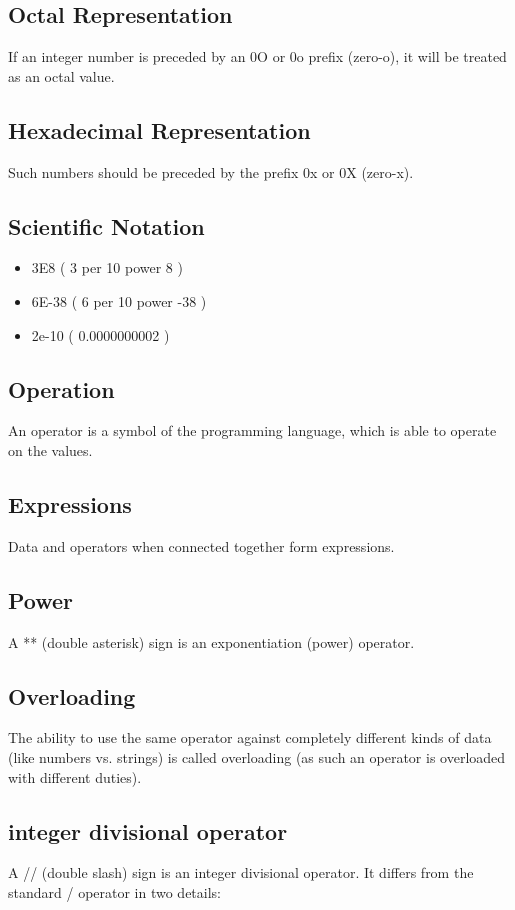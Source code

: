 \documentclass[11pt]{article}
\begin{document}
\subsection{Octal Representation}
\label{sec:org6dae7c2}
If an integer number is preceded by an 0O or 0o prefix (zero-o), it
will be treated as an octal value.
\subsection{Hexadecimal Representation}
\label{sec:org4079ec7}
Such numbers should be preceded by the prefix 0x or 0X (zero-x).
\subsection{Scientific Notation}
\label{sec:org9479470}
\begin{itemize}
\item 3E8 ( 3 per 10 power 8 )
\item 6E-38 ( 6 per 10 power -38 )
\item 2e-10 ( 0.0000000002 )
\end{itemize}
\subsection{Operation}
\label{sec:org9a54c5a}
An operator is a symbol of the programming language, which is able to
operate on the values.
\subsection{Expressions}
\label{sec:org09afd1d}
Data and operators when connected together form expressions.
\subsection{Power}
\label{sec:org1b5a105}
A ** (double asterisk) sign is an exponentiation (power) operator.
\subsection{Overloading}
\label{sec:org693696f}
The ability to use the same operator against completely different
kinds of data (like numbers vs. strings) is called overloading (as
such an operator is overloaded with different duties).
\subsection{integer divisional operator}
\label{sec:org4f5f94f}
A // (double slash) sign is an integer divisional operator. It differs
from the standard / operator in two details:
\end{document}
